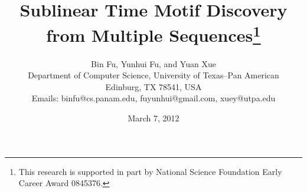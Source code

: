 \documentclass[11pt]{article}
\begin{document}
\setcounter{page}{1}
\date{March 7, 2012}

\title{Sublinear Time Motif Discovery from Multiple Sequences\thanks{This research is supported in part by
National Science Foundation Early Career Award 0845376.}}



\author{ Bin Fu, Yunhui Fu,  and Yuan Xue\\
Department of Computer Science, University of Texas--Pan American\\
Edinburg, TX 78541, USA\\
Emails: binfu@cs.panam.edu,  fuyunhui@gmail.com, xuey@utpa.edu}
\maketitle
\end{document}
